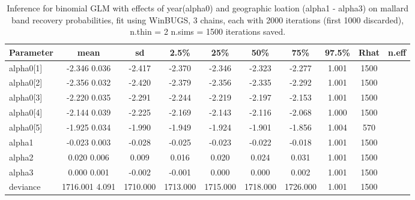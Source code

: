 \begin{table}
\caption{Inference for binomial GLM with effects of year(alpha0) and geographic loation (alpha1 - alpha3) on mallard band recovery probabilities, fit using WinBUGS, 3 chains, each with 2000 iterations (first 1000 discarded), n.thin = 2
 n.sims = 1500 iterations saved.}
   \scriptsize
  \begin{tabular}{lccccccccc}
    \hline
        \hline
 Parameter &    mean   & sd   &  2.5\%    &  25\%  &    50\%   &   75\%  &  97.5\% & Rhat & n.eff \\
     \hline
alpha0[1]  & -2.346 0.036 &  -2.417 &  -2.370 &  -2.346 &  -2.323 &  -2.277 & 1.001 & 1500 \\
alpha0[2] &  -2.356 0.032 &  -2.420 &  -2.379 &  -2.356 &  -2.335 &  -2.292 & 1.001 & 1500 \\
alpha0[3] &  -2.220 0.035 &  -2.291 &  -2.244 &  -2.219 &  -2.197 &  -2.153 & 1.001 & 1500 \\
alpha0[4] &  -2.144 0.039 &  -2.225 &  -2.169 &  -2.143 &  -2.116 &  -2.068 & 1.000 & 1500 \\
alpha0[5] &  -1.925 0.034 &  -1.990 &  -1.949 &  -1.924 &  -1.901 &  -1.856 & 1.004 & 570 \\
alpha1    &  -0.023 0.003 &  -0.028 &  -0.025 &  -0.023 &  -0.022 &  -0.018 & 1.001 & 1500 \\
alpha2    &   0.020 0.006 &   0.009 &   0.016 &   0.020 &   0.024 &   0.031 & 1.001 & 1500 \\
alpha3    &   0.000 0.001 &  -0.002 &  -0.001 &   0.000 &   0.000 &   0.002 & 1.001 & 1500 \\
deviance & 1716.001 4.091 & 1710.000 & 1713.000 & 1715.000 & 1718.000 & 1726.000 & 1.001 & 1500 \\
    \hline
  \end{tabular}
  \label{glms.tab.mallard}
\vspace{0.5cm}
\end{table}


